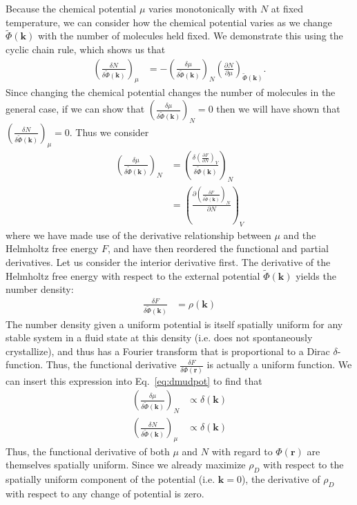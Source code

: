 \documentclass[twoside,twocolumn,9pt]{article}
\newcommand{\rvec}{\mathbf{r}}
\newcommand{\kvec}{\mathbf{k}}
\newcommand\V{\Phi}
\newcommand\Vk{\tilde\Phi(\kvec)}
\newcommand\volume{V}
\begin{document}
Because the chemical potential $\mu$ varies monotonically with $N$ at fixed
temperature, we can consider how the chemical potential varies as we change
$\Vk$ with the number of molecules held fixed. We demonstrate this using the
cyclic chain rule, which shows us that
\begin{align}
    \left(\frac{\delta N}{\delta \Vk}\right)_{\mu} &=
    -\left(\frac{\delta \mu}{\delta \Vk}\right)_{N}
    \left(\frac{\partial N}{\partial \mu}\right)_{\Vk}.
\end{align}
Since changing the chemical potential changes the number of molecules in the
general case, if we can show that $\left(\frac{\delta \mu}{\delta
\Vk}\right)_{N}=0$ then we will have shown that $\left(\frac{\delta N}{\delta
\Vk}\right)_{\mu}=0$. Thus we consider
\begin{align}
    \left(\frac{\delta \mu}{\delta \Vk}\right)_N
    &= \left(\frac{\delta \left(\frac{\partial F}{\partial N}\right)_{\volume}}{\delta \Vk}\right)_N
    \\
    &= \left(\frac{\partial \left(\frac{\delta F}{\delta \Vk}\right)_{N}}{\partial N}\right)_{\volume}
    \label{eq:dmudpot}
\end{align}
where we have made use of the derivative relationship between $\mu$ and the
Helmholtz free energy $F$, and have then reordered the functional and partial
derivatives. Let us consider the interior derivative first. The derivative of
the Helmholtz free energy with respect to the external potential $\Vk$ yields
the number density:
\begin{align}
    \frac{\delta F}{\delta \Vk} &= \rho(\kvec)
\end{align}
The number density given a uniform potential is itself spatially uniform for
any stable system in a fluid state at this density (i.e. does not spontaneously
crystallize), and thus has a Fourier transform that is proportional to a Dirac
$\delta$-function. Thus, the functional derivative $\frac{\delta F}{\delta
\V(\rvec)}$ is actually a uniform function. We can insert this expression into
Eq.~\ref{eq:dmudpot} to find that
\begin{align}
    \left(\frac{\delta \mu}{\delta \Vk}\right)_N &\propto \delta(\kvec) \\
    \left(\frac{\delta N}{\delta \Vk}\right)_\mu &\propto \delta(\kvec)
\end{align}
Thus, the functional derivative of both $\mu$ and $N$ with regard to
$\V(\rvec)$ are themselves spatially uniform. Since we already maximize
$\rho_D$ with respect to the spatially uniform component of the potential (i.e.
$\kvec=0$), the derivative of $\rho_D$ with respect to any change of potential
is zero.
\end{document}
